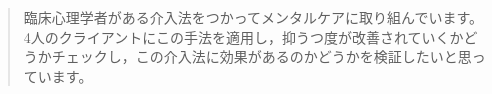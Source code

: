 \begin{quote}
	臨床心理学者がある介入法をつかってメンタルケアに取り組んでいます。
	4人のクライアントにこの手法を適用し，抑うつ度が改善されていくかどうかチェックし，この介入法に効果があるのかどうかを検証したいと思っています。
\end{quote}

